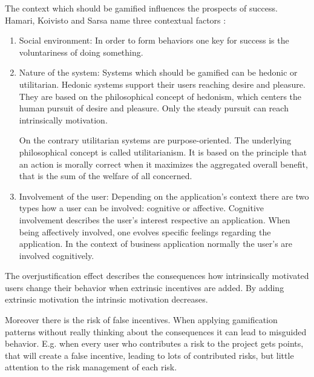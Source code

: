 The context which should be gamified influences the prospects of success.  Hamari, Koivisto and Sarsa name three contextual factors \cite[p. 3029, 3030]{hamariDoesGamificationWork2014}:
\begin{enumerate}
	\item Social environment: \newline
	In order to form behaviors  one key for success is the voluntariness of doing something. \cite[p. 3030]{hamariDoesGamificationWork2014}
		
	\item Nature of the system: \newline
	Systems which should be gamified can be hedonic or utilitarian. Hedonic systems support their users reaching desire and pleasure. \cite[p. 3030]{hamariDoesGamificationWork2014}
	They are based on the philosophical concept of hedonism, which centers the human pursuit of desire and pleasure. Only the steady pursuit can reach intrinsically motivation. \cite[p. LV ]{mueller-saloHenrySidgwickUtilitarismus2019}
		
	On the contrary utilitarian systems are purpose-oriented. The underlying philosophical concept is called utilitarianism. It is based on the principle that an action is morally correct when it maximizes the aggregated overall benefit, that is the sum of the welfare of all concerned. \cite[p. 3 ]{mueller-saloHenrySidgwickUtilitarismus2019}
		
	\item Involvement of the user: \newline
	Depending on the application's context there are two types how a user can be involved: cognitive or affective. \cite[p. 3030]{hamariDoesGamificationWork2014} Cognitive involvement describes the user's interest respective an application. When being affectively involved, one evolves specific feelings regarding the application. In the context of business application normally the user's are involved cognitively. \cite{zaichkowskyPersonalInvolvementInventory2013}
\end{enumerate}

The overjustification effect describes the consequences how intrinsically motivated users change their behavior when extrinsic incentives are added. By adding extrinsic motivation the intrinsic motivation decreases. \cite[p. 9-13]{bierhoffeditorEnzyklopaediePsychologieSoziale2016}
	
Moreover there is the risk of false incentives. When applying gamification patterns without really thinking about the consequences it can lead to misguided behavior. E.g. when every user who contributes a risk to the project gets points, that will create a false incentive, leading to lots of contributed risks, but little attention to the risk management of each risk. \cite[p.69]{kumarGamificationWorkDesigning2013}
 
